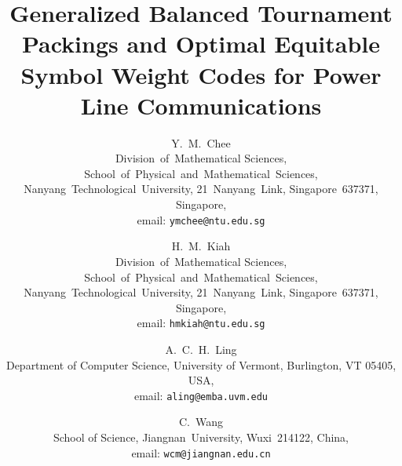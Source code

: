 \documentclass[draft, 11pt]{article}
\begin{document}
\title{Generalized Balanced Tournament Packings and Optimal Equitable Symbol Weight Codes for Power Line Communications}


\author{Y.~M.~Chee \\
\small Division~of~Mathematical Sciences, School~of~Physical~and~Mathematical~Sciences, \\
\small Nanyang~Technological~University, 21~Nanyang~Link, Singapore~637371, Singapore,\\
\small email: {\tt ymchee@ntu.edu.sg} 
\and H.~M.~Kiah \\
\small Division~of~Mathematical Sciences, School~of~Physical~and~Mathematical~Sciences, \\
\small Nanyang~Technological~University, 21~Nanyang~Link, Singapore~637371, Singapore,\\
\small email: {\tt hmkiah@ntu.edu.sg} 
\and A.~C.~H.~Ling \\
\small Department of Computer Science, University of Vermont, Burlington, VT 05405, USA,\\
\small email: {\tt aling@emba.uvm.edu}
\and C.~Wang\\
\small School of Science, Jiangnan~University, Wuxi~214122, China,\\
\small email: {\tt wcm@jiangnan.edu.cn}
}


 
\theoremstyle{definition}
 
\newtheorem{theorem}{Theorem}[section]
\newtheorem{proposition}[theorem]{Proposition}
\newtheorem{definition}[theorem]{Definition}
\newtheorem{lemma}[theorem]{Lemma}
\newtheorem{corollary}[theorem]{Corollary}


\theoremstyle{remark}
\newtheorem{claim}{Claim}[section]
\newtheorem{example}{Example}[section]

 

\newcommand{\vA}{{\sf A}}
\newcommand{\vB}{{\sf B}}
\newcommand{\vC}{{\sf C}}
\newcommand{\vD}{{\sf D}}
\newcommand{\vE}{{\sf E}}
\newcommand{\vF}{{\sf F}}

\newcommand{\vW}{{\sf W}}

\newcommand{\vc}{{\sf c}}
\newcommand{\vu}{{\sf u}}
\newcommand{\vv}{{\sf v}}
\newcommand{\vw}{{\sf w}}
\newcommand{\tA}{\textrm A}
\newcommand{\tB}{\textrm B}
\newcommand{\A}{\mathcal A}
\newcommand{\B}{\mathcal B}
\newcommand{\C}{\mathcal C}
\newcommand{\D}{\mathcal D}
\newcommand{\G}{\mathcal G}
\newcommand{\R}{\mathcal R}
\newcommand{\SSS}{\mathcal S}
\end{document}
